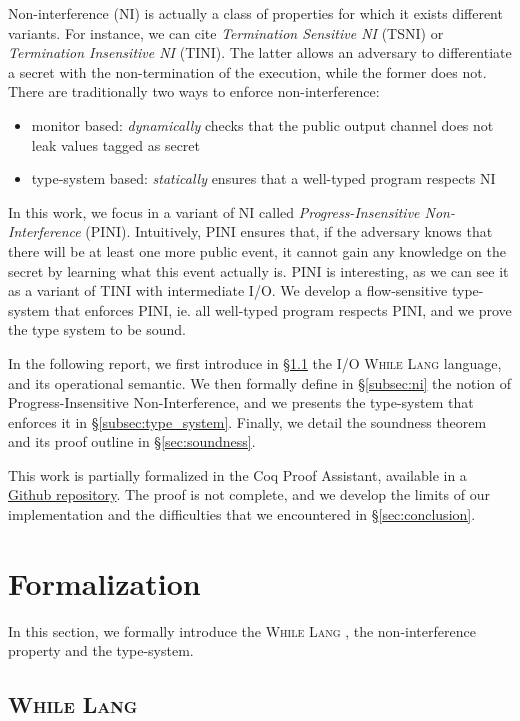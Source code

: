 \documentclass[10pt]{article}
\newcommand{\whilelang}{\textsc{While Lang} }
\begin{document}
Non-interference (NI) is actually a class of properties for which it exists different variants. For
instance, we can cite \emph{Termination Sensitive NI} (TSNI) or \emph{Termination Insensitive NI}
(TINI). The latter allows an adversary to differentiate a secret with the non-termination of the
execution, while the former does not.
There are traditionally two ways to enforce non-interference:
\begin{itemize}
  \item monitor based: \emph{dynamically} checks that the public output channel does not leak values
        tagged as secret
  \item type-system based: \emph{statically} ensures that a well-typed program respects NI
\end{itemize}

In this work, we focus in a variant of NI called \emph{Progress-Insensitive Non-Interference}
(PINI).
Intuitively, PINI ensures that, if the adversary knows that there will be at least one more public
event, it cannot gain any knowledge on the secret by learning what this event actually is. PINI is
interesting, as we can see it as a variant of TINI with intermediate I/O.
We develop a flow-sensitive type-system that enforces PINI, ie. all well-typed program respects PINI,
and we prove the type system to be sound.

In the following report, we first introduce in
\S\ref{subsec:opsem} the I/O \whilelang language, and its operational semantic.
We then formally define in \S\ref{subsec:ni} the notion of Progress-Insensitive
Non-Interference, and we presents the type-system that enforces it in
\S\ref{subsec:type_system}.
Finally, we detail the soundness theorem and its proof outline in \S\ref{sec:soundness}.

This work is partially formalized in the Coq Proof Assistant, available in a
\href{https://github.com/BastienRousseau/flow-sensitive-PINI}{Github repository}.
The proof is not complete, and we develop the limits of our implementation and the difficulties
that we encountered in \S\ref{sec:conclusion}.

\section{Formalization}
\label{sec:formalization}
In this section, we formally introduce the \whilelang, the non-interference property and the
type-system.

\subsection{\whilelang}%
\label{subsec:opsem}
\end{document}
